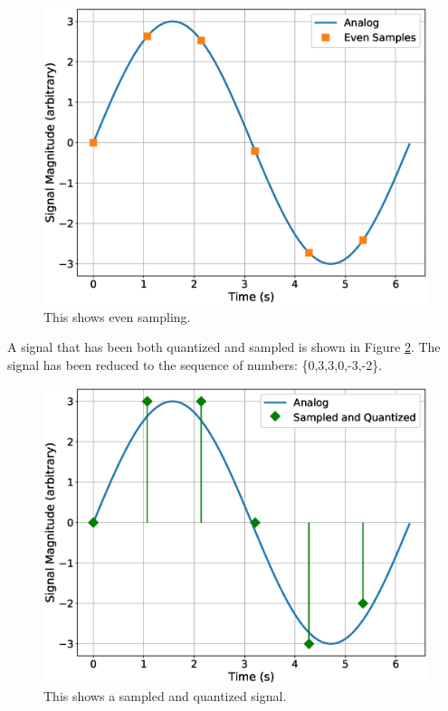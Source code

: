 \begin{figure}[!htb]
	\centering
	\includegraphics[scale=0.5]{dataCollection/evenSampling.eps}
	\caption{This shows even sampling.}
	\label{fig:evensampling}
\end{figure}

A signal that has been both quantized and sampled is shown in Figure \ref{fig:samplequantized}. The 
signal has been reduced to the sequence of numbers: \{0,3,3,0,-3,-2\}.

\begin{figure}[!htb]
	\centering
	\includegraphics[scale=0.5]{dataCollection/sampledAndQuantized.eps}
	\caption{This shows a sampled and quantized signal.}
	\label{fig:samplequantized}
\end{figure}

